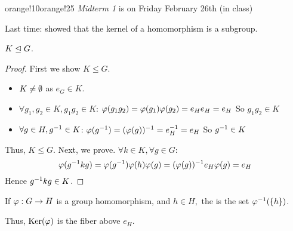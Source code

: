 \documentclass[notes.tex]{subfiles}
\begin{document}

\begin{classnote}{orange!10}{orange!25}
\emph{Midterm 1} is on Friday February 26th (in class)
\end{classnote}

Last time: showed that the kernel of a homomorphism is a subgroup.

\begin{proposition}
	$K\trianglelefteq G$.
\end{proposition}

\begin{proof}
	First we show $K\le G$.
	\begin{itemize}
		\item $K \ne \emptyset$ as $e_G\in K$.
		\item $\forall g_1, g_2\in K, g_1g_2\in K$:
		\tabin
			$\varphi(g_1g_2) = \varphi(g_1)\varphi(g_2) =e_He_H = e_H$
			So $g_1g_2\in K$
		\tabout
		\item $\forall g\in H, {g}^{-1} \in K$:
		\tabin
			$\varphi({g}^{-1}) = (\varphi(g))^{-1} = {e}^{-1}_H = e_H$
		\tabout
		So ${g}^{-1} \in K$
	\end{itemize}
	Thus, $K\le G$.
	Next, we prove. 
	$\forall k\in K, \forall g\in G$:
		\[
			\varphi({g}^{-1}kg) 
			= \varphi({g}^{-1})\varphi(h)\varphi(g) 
			= (\varphi(g))^{-1}e_H\varphi(g)
			= e_H
		\]
	Hence ${g}^{-1}kg\in K$.
\end{proof}

\begin{defn}
	If $\varphi :G\to H$ is a group homomorphism, and $h\in H,$ the  is the set ${\varphi}^{-1}(\{h\})$.
\end{defn}

Thus, $\operatorname{\mathrm{Ker}}(\varphi)$ is the fiber above $e_H$.
\end{document}
